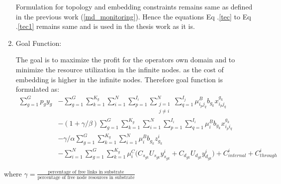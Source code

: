 \documentclass[article,dr=phil,type=msc ,colorback,accentcolor=tud4b]{tudthesis}
\begin{document}
\begin{enumerate}[label=(\Alph*)]
	Formulation for topology and embedding constraints remains same as defined in the previous work (\ref{md_monitoring}). Hence the equations Eq .\ref{tec} to Eq .\ref{tec1} remains same and is used in the thesis work as it is.
	
	\item Goal Function:
	
	The goal is to maximize the profit for the operators own domain and to minimize the resource utilization in the infinite nodes. as the cost of embedding is higher in the infinite nodes. Therefore goal function is formulated as:
	\begin{equation} \label{part_enb_goal}
	\begin{aligned}
	\sum_{g=1}^{G} p_{g} y_{g} &- \sum_{g=1}^{G} \sum_{k=1}^{K_{g}}  \sum_{i=1}^{N} \sum_{p=1}^{I_{i}} \sum_{\substack{j=1 \\ j\neq i}}^{N} \sum_{q=1}^{I_{j}} \mu^{B}_{i_{p}j_{q}} b_{g_{k}} x^{g_{k}}_{i_{p}j_{q}}\\ &- (1+\gamma/\beta) \sum_{g=1}^{G} \sum_{k=1}^{K_{g}}  \sum_{i=1}^{N} \sum_{p=1}^{I_{i}} \sum_{q=1}^{I_{i}}  \mu^{B}_{i} b_{g_{k}}  x^{g_{k}}_{i_{p}i_{q}}\\ &- \gamma/\alpha \sum_{g=1}^{G} \sum_{k=1}^{K_{g}}  \sum_{i=1}^{N}  \mu^{B}_{i} b_{g_{k}} z_{g_{k}}^{i} \\ &- \sum_{i=1}^{N} \sum_{g=1}^{G} \sum_{k=1}^{K_{g}} \mu^{C}_{i}  \big( C_{s_{gk}} U_{s_{gk}}  y^{i}_{s_{gk}} +  C_{d_{gk}} U_{d_{gk}} y^{i}_{d_{gk}} \big) + C_{internal}^{i} + C_{through}^{i}
	\end{aligned}
	\end{equation}
\end{enumerate}
where $\gamma = \frac{\text{percentage of free links in substrate}}{\text{percentage of free node resources in substrate}}$ \newline
\end{document}
